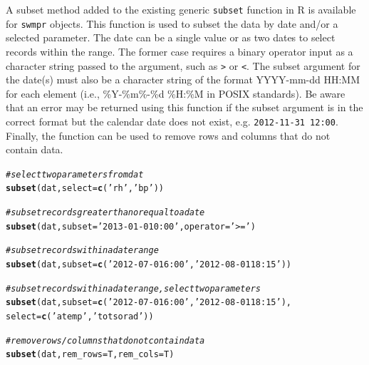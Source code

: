 \documentclass[10pt,letterpaper]{article}\usepackage[]{graphicx}\usepackage[]{color}
\makeatletter
\newcommand{\hlstr}[1]{\textcolor[rgb]{0.192,0.494,0.8}{#1}}%
\newcommand{\hlcom}[1]{\textcolor[rgb]{0.678,0.584,0.686}{\textit{#1}}}%
\newcommand{\hlstd}[1]{\textcolor[rgb]{0.345,0.345,0.345}{#1}}%
\newcommand{\hlkwc}[1]{\textcolor[rgb]{0.333,0.667,0.333}{#1}}%
\newcommand{\hlkwd}[1]{\textcolor[rgb]{0.737,0.353,0.396}{\textbf{#1}}}%
\newenvironment{kframe}{%
 \def\at@end@of@kframe{}%
 \ifinner\ifhmode%
  \def\at@end@of@kframe{\end{minipage}}%
  \begin{minipage}{\columnwidth}%
 \fi\fi%
 \def\FrameCommand##1{\hskip\@totalleftmargin \hskip-\fboxsep
 \colorbox{shadecolor}{##1}\hskip-\fboxsep
     \hskip-\linewidth \hskip-\@totalleftmargin \hskip\columnwidth}%
 \MakeFramed {\advance\hsize-\width
   \@totalleftmargin\z@ \linewidth\hsize
   \@setminipage}}%
 {\par\unskip\endMakeFramed%
 \at@end@of@kframe}
\newenvironment{knitrout}{}{} %
\makeatother
\begin{document}
A subset method added to the existing generic \texttt{subset} function in R is available for \texttt{swmpr} objects.  This function is used to subset the data by date and/or a selected parameter.  The date can be a single value or as two dates to select records within the range. The former case requires a binary operator input as a character string passed to the argument, such as \texttt{>} or \texttt{<}.  The subset argument for the date(s) must also be a character string of the format YYYY-mm-dd HH:MM for each element (i.e., \%Y-\%m\%-\%d \%H:\%M in POSIX standards).  Be aware that an error may be returned using this function if the subset argument is in the correct format but the calendar date does not exist, e.g. \texttt{2012-11-31 12:00}.  Finally, the function can be used to remove rows and columns that do not contain data. 

\begin{knitrout}
\color{fgcolor}\begin{kframe}
\begin{alltt}
\hlcom{# select two parameters from dat}
\hlkwd{subset}\hlstd{(dat,} \hlkwc{select} \hlstd{=} \hlkwd{c}\hlstd{(}\hlstr{'rh'}\hlstd{,} \hlstr{'bp'}\hlstd{))}

\hlcom{# subset records greater than or equal to a date}
\hlkwd{subset}\hlstd{(dat,} \hlkwc{subset} \hlstd{=} \hlstr{'2013-01-01 0:00'}\hlstd{,} \hlkwc{operator} \hlstd{=} \hlstr{'>='}\hlstd{)}

\hlcom{# subset records within a date range}
\hlkwd{subset}\hlstd{(dat,} \hlkwc{subset} \hlstd{=} \hlkwd{c}\hlstd{(}\hlstr{'2012-07-01 6:00'}\hlstd{,} \hlstr{'2012-08-01 18:15'}\hlstd{))}

\hlcom{# subset records within a date range, select two parameters}
\hlkwd{subset}\hlstd{(dat,} \hlkwc{subset} \hlstd{=} \hlkwd{c}\hlstd{(}\hlstr{'2012-07-01 6:00'}\hlstd{,} \hlstr{'2012-08-01 18:15'}\hlstd{),}
  \hlkwc{select} \hlstd{=} \hlkwd{c}\hlstd{(}\hlstr{'atemp'}\hlstd{,} \hlstr{'totsorad'}\hlstd{))}

\hlcom{# remove rows/columns that do not contain data}
\hlkwd{subset}\hlstd{(dat,} \hlkwc{rem_rows} \hlstd{= T,} \hlkwc{rem_cols} \hlstd{= T)}
\end{alltt}
\end{kframe}
\end{knitrout}
\end{document}
